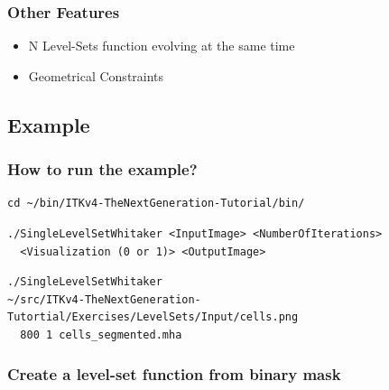 
\begin{frame}
\frametitle{Other Features}
  \begin{itemize}
    \item N Level-Sets function evolving at the same time
    \item Geometrical Constraints
  \end{itemize}
\end{frame}

\subsection{Example}


\begin{frame}[fragile]
  \frametitle{How to run the example?}
  \fontsize{8pt}{8pt}\selectfont
\begin{verbatim}
cd ~/bin/ITKv4-TheNextGeneration-Tutorial/bin/
\end{verbatim}
\newline
\begin{verbatim}
./SingleLevelSetWhitaker <InputImage> <NumberOfIterations>
  <Visualization (0 or 1)> <OutputImage>
\end{verbatim}
\newline
\begin{verbatim}
./SingleLevelSetWhitaker 
~/src/ITKv4-TheNextGeneration-Tutortial/Exercises/LevelSets/Input/cells.png 
  800 1 cells_segmented.mha
\end{verbatim}
\end{frame}

\begin{frame}
  \frametitle{Create a level-set function from binary mask}
\end{frame}

